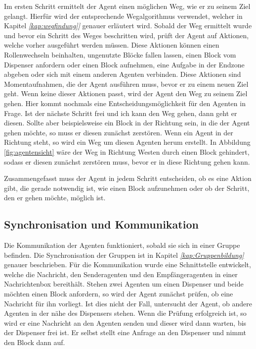 Im ersten Schritt ermittelt der Agent einen möglichen Weg, wie er zu seinem Ziel gelangt. Hierfür wird der entsprechende Wegalgorithmus verwendet, welcher in Kapitel \textit{\ref{kap:wegfindung}]} genauer erläutert wird. Sobald der Weg ermittelt wurde und bevor ein Schritt des Weges beschritten wird, prüft der Agent auf Aktionen, welche vorher ausgeführt werden müssen. Diese Aktionen können einen Rollenwechseln beinhalten, ungenutzte Blöcke fallen lassen, einen Block vom Dispenser anfordern oder einen Block aufnehmen, eine Aufgabe in der Endzone abgeben oder sich mit einem anderen Agenten verbinden. Diese Aktionen sind Momentaufnahmen, die der Agent ausführen muss, bevor er zu einem neuen Ziel geht. Wenn keine dieser Aktionen passt, wird der Agent den Weg zu seinem Ziel gehen. Hier kommt nochmals eine Entscheidungsmöglichkeit für den Agenten in Frage. Ist der nächste Schritt frei und ich kann den Weg gehen, dann geht er diesen. Sollte aber beispielsweise ein Block in der Richtung sein, in die der Agent gehen möchte, so muss er diesen zunächst zerstören. Wenn ein Agent in der Richtung steht, so wird ein Weg um diesen Agenten herum erstellt. In Abbildung \ref{fig:agentensicht} wäre der Weg in Richtung Westen durch einen Block gehindert, sodass er diesen zunächst zerstören muss, bevor er in diese Richtung gehen kann. 

Zusammengefasst muss der Agent in jedem Schritt entscheiden, ob es eine Aktion gibt, die gerade notwendig ist, wie einen Block aufzunehmen oder ob der Schritt, den er gehen möchte, möglich ist.  

\subsection{Synchronisation und Kommunikation}
Die Kommunikation der Agenten funktioniert, sobald sie sich in einer Gruppe befinden. Die Synchronisation der Gruppen ist in Kapitel \textit{\ref{kap:Gruppenbildung}} genauer beschrieben. Für die Kommunikation wurde eine Schnittstelle entwickelt, welche die Nachricht, den Senderagenten und den Empfängeragenten in einer Nachrichtenbox bereithält. Stehen zwei Agenten um einen Dispenser und beide möchten einen Block anfordern, so wird der Agent zunächst prüfen, ob eine Nachricht für ihn vorliegt. Ist dies nicht der Fall, untersucht der Agent, ob andere Agenten in der nähe des Dispensers stehen. Wenn die Prüfung erfolgreich ist, so wird er eine Nachricht an den Agenten senden und dieser wird dann warten, bis der Dispenser frei ist. Er selbst stellt eine Anfrage an den Dispenser und nimmt den Block dann auf. 